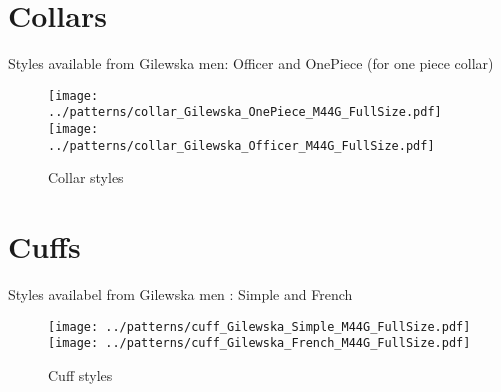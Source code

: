 \documentclass[11pt,a4paper]{article}
\begin{document}
\section{Collars}
Styles available from Gilewska men: Officer and OnePiece (for one piece collar)

\begin{figure}
\begin{center}
\texttt{[image: ../patterns/collar\_Gilewska\_OnePiece\_M44G\_FullSize.pdf]} 
\texttt{[image: ../patterns/collar\_Gilewska\_Officer\_M44G\_FullSize.pdf]} 
\end{center}
\caption{Collar styles}
\end{figure}


\section{Cuffs}
Styles availabel from Gilewska men : Simple and French

\begin{figure}
\begin{center}
\texttt{[image: ../patterns/cuff\_Gilewska\_Simple\_M44G\_FullSize.pdf]} 
\texttt{[image: ../patterns/cuff\_Gilewska\_French\_M44G\_FullSize.pdf]} 
\end{center}
\caption{Cuff styles}
\end{figure}





\end{document}
